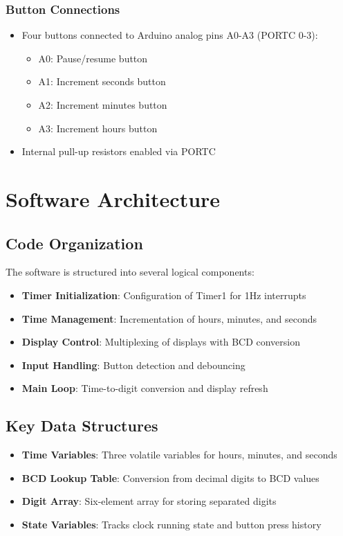 \documentclass[12pt,a4paper]{article}
\begin{document}
\subsubsection{Button Connections}
\begin{itemize}
    \item Four buttons connected to Arduino analog pins A0-A3 (PORTC 0-3):
    \begin{itemize}
        \item A0: Pause/resume button
        \item A1: Increment seconds button
        \item A2: Increment minutes button
        \item A3: Increment hours button
    \end{itemize}
    \item Internal pull-up resistors enabled via PORTC
\end{itemize}

\section{Software Architecture}

\subsection{Code Organization}

The software is structured into several logical components:

\begin{itemize}
    \item \textbf{Timer Initialization}: Configuration of Timer1 for 1Hz interrupts
    \item \textbf{Time Management}: Incrementation of hours, minutes, and seconds
    \item \textbf{Display Control}: Multiplexing of displays with BCD conversion
    \item \textbf{Input Handling}: Button detection and debouncing
    \item \textbf{Main Loop}: Time-to-digit conversion and display refresh
\end{itemize}

\subsection{Key Data Structures}

\begin{itemize}
    \item \textbf{Time Variables}: Three volatile variables for hours, minutes, and seconds
    \item \textbf{BCD Lookup Table}: Conversion from decimal digits to BCD values
    \item \textbf{Digit Array}: Six-element array for storing separated digits
    \item \textbf{State Variables}: Tracks clock running state and button press history
\end{itemize}
\end{document}
